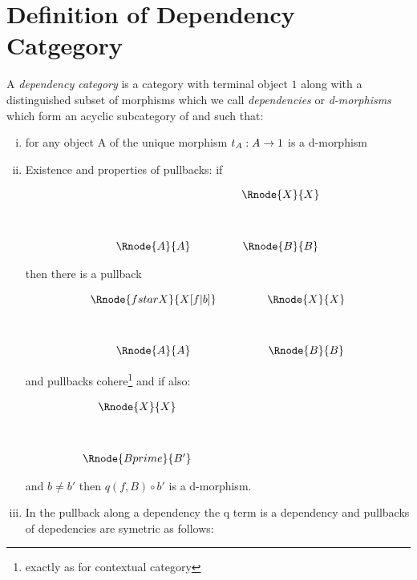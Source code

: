 \documentclass[10pt,a4paper]{article}
\begin{document}
\section{Definition of Dependency Catgegory}
A \textit{dependency category} is a category  with terminal object $1$ along with a distinguished subset of morphisms which we call \textit{dependencies} or \textit{d-morphisms} which form an acyclic subcategory of  and such that:

\begin{enumerate} [(i)]
	\item for any object A of  the unique morphism $t_A:A \rightarrow 1$ is a d-morphism
	\item Existence and properties of pullbacks: if
\begin{center}
\begin{displaymath}
\begin{array}{cp{.9cm}c}
            & & \Rnode{X}{X} \\ [1.2cm]
\Rnode{A}{A}& & \Rnode{B}{B} \\
\end{array}
\end{displaymath}
\end{center}

then there is a pullback 
\vspace{3mm}
\begin{center}
\begin{displaymath}
\begin{array}{cp{.9cm}c}
\Rnode{fstarX}{X[f|b]} & & \Rnode{X}{X}\\ [1.2cm]
\Rnode{A}{A}         & & \Rnode{B}{B}
\end{array}
\end{displaymath}
\end{center}
and pullbacks cohere\footnote{exactly as for contextual category}
and if also:
\begin{center}
$
\begin{array}{cp{.9cm}c}
            & & \Rnode{X}{X} \\ [1.2cm]
& & \Rnode{Bprime}{B'} \\
\end{array}
$
\end{center}
and $b \neq b'$ then $q(f,B) \circ b'$ is a d-morphism. 

\item In the pullback  along a dependency the q term is a dependency and pullbacks of depedencies are symetric as follows:


\end{enumerate}
\end{document}
